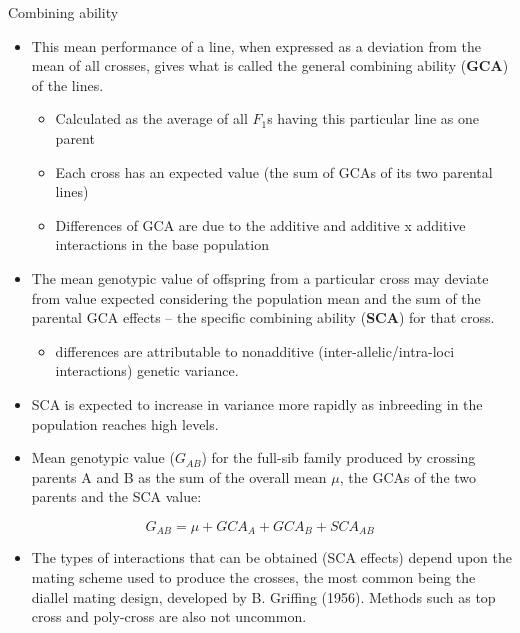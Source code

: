 \documentclass[11pt,dvipsnames,ignorenonframetext,aspectratio=169]{beamer}
\providecommand{\tightlist}{%
  \setlength{\itemsep}{0pt}\setlength{\parskip}{0pt}}
\begin{document}
\begin{frame}{Combining ability}
\protect\hypertarget{combining-ability}{}
\begin{itemize}
\tightlist
\item
  This mean performance of a line, when expressed as a deviation from
  the mean of all crosses, gives what is called the general combining
  ability (\textbf{GCA}) of the lines.

  \begin{itemize}
  \tightlist
  \item
    Calculated as the average of all \(F_1\)s having this particular
    line as one parent
  \item
    Each cross has an expected value (the sum of GCAs of its two
    parental lines)
  \item
    Differences of GCA are due to the additive and additive x additive
    interactions in the base population
  \end{itemize}
\item
  The mean genotypic value of offspring from a particular cross may
  deviate from value expected considering the population mean and the
  sum of the parental GCA effects -- the specific combining ability
  (\textbf{SCA}) for that cross.

  \begin{itemize}
  \tightlist
  \item
    differences are attributable to nonadditive
    (inter-allelic/intra-loci interactions) genetic variance.
  \end{itemize}
\item
  SCA is expected to increase in variance more rapidly as inbreeding in
  the population reaches high levels.
\end{itemize}
\end{frame}

\begin{frame}{}
\protect\hypertarget{section-3}{}
\begin{itemize}
\tightlist
\item
  Mean genotypic value (\(G_{AB}\)) for the full-sib family produced by
  crossing parents A and B as the sum of the overall mean \(\mu\), the
  GCAs of the two parents and the SCA value:
\end{itemize}

\[G_{AB} = \mu + GCA_A + GCA_B + SCA_{AB}\]

\begin{itemize}
\tightlist
\item
  The types of interactions that can be obtained (SCA effects) depend
  upon the mating scheme used to produce the crosses, the most common
  being the diallel mating design, developed by B. Griffing (1956).
  Methods such as top cross and poly-cross are also not uncommon.
\end{itemize}
\end{frame}
\end{document}
